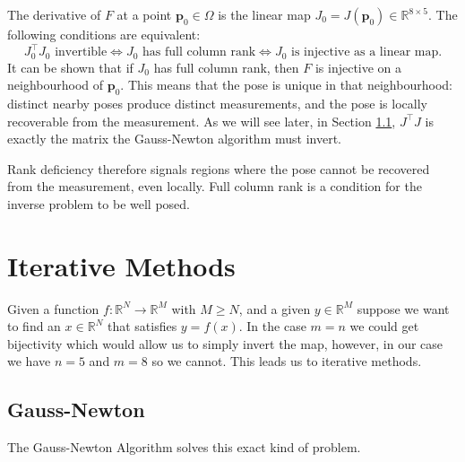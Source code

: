 The derivative of $F$ at a point $\mathbf{p}_0 \in \Omega$ is the linear map
$J_0 = J(\mathbf{p}_0) \in \mathbb{R}^{8 \times 5}$. The following conditions are
equivalent:
$$
  J_0^\top J_0 \text{ invertible}
  \iff J_0 \text{ has full column rank}
  \iff J_0 \text{ is injective as a linear map.}
$$
It can be shown \cite{mckay2022} that if $J_0$ has full column rank, then $F$ is
injective on a neighbourhood of $\mathbf{p}_0$. This means that the pose is unique
in that neighbourhood: distinct nearby poses produce distinct measurements, and the
pose is locally recoverable from the measurement. As we will see later, in Section \ref{sec:GN}, $J^\top J$ is exactly the matrix the Gauss-Newton algorithm must invert. 

Rank deficiency therefore signals regions where the pose cannot be recovered from
the measurement, even locally. Full column rank is a condition for the inverse
problem to be well posed.

\section{Iterative Methods}
Given a function $f : \mathbb{R}^N \rightarrow \mathbb{R}^M$ with $M \geq N$, and a given $y \in \mathbb{R}^M$ suppose we want to find an $x \in \mathbb{R}^N$ that satisfies $y = f(x)$. In the case $m = n$ we could get bijectivity which would allow us to simply invert the map, however, in our case we have $n = 5$ and $m = 8$ so we cannot. This leads us to iterative methods.

\subsection{Gauss-Newton}\label{sec:GN}
The Gauss-Newton Algorithm \cite{nocedal2006} solves this exact kind of problem. 

